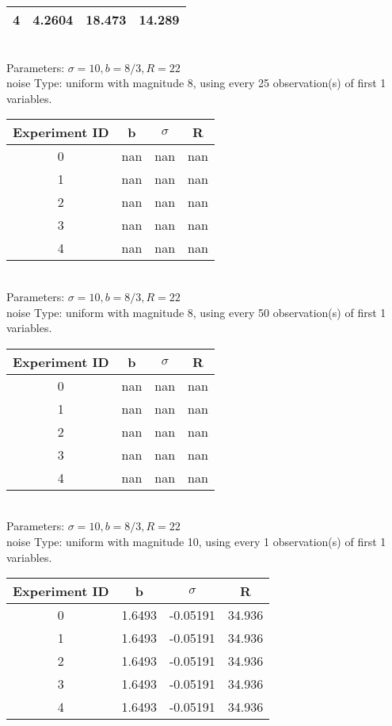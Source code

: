 \begin{multicols}{3}
\begin{tabular}{cccc}
 4 & 4.2604 & 18.473 & 14.289\\ \hline 
 \end{tabular}\\
Parameters: $\sigma=10, b=8/3, R=22$\\
noise Type: uniform with magnitude 8, using every 25 observation(s) of first 1 variables.\\
\begin{tabular}{cccc}
\hline Experiment ID & b & $\sigma$ & R \\ \hline 
0 & nan & nan & nan\\ \hline 
 1 & nan & nan & nan\\ \hline 
 2 & nan & nan & nan\\ \hline 
 3 & nan & nan & nan\\ \hline 
 4 & nan & nan & nan\\ \hline 
 \end{tabular}\\
Parameters: $\sigma=10, b=8/3, R=22$\\
noise Type: uniform with magnitude 8, using every 50 observation(s) of first 1 variables.\\
\begin{tabular}{cccc}
\hline Experiment ID & b & $\sigma$ & R \\ \hline 
0 & nan & nan & nan\\ \hline 
 1 & nan & nan & nan\\ \hline 
 2 & nan & nan & nan\\ \hline 
 3 & nan & nan & nan\\ \hline 
 4 & nan & nan & nan\\ \hline 
 \end{tabular}\\
Parameters: $\sigma=10, b=8/3, R=22$\\
noise Type: uniform with magnitude 10, using every 1 observation(s) of first 1 variables.\\
\begin{tabular}{cccc}
\hline Experiment ID & b & $\sigma$ & R \\ \hline 
0 & 1.6493 & -0.05191 & 34.936\\ \hline 
 1 & 1.6493 & -0.05191 & 34.936\\ \hline 
 2 & 1.6493 & -0.05191 & 34.936\\ \hline 
 3 & 1.6493 & -0.05191 & 34.936\\ \hline 
 4 & 1.6493 & -0.05191 & 34.936\\ \hline 
 \end{tabular}\\

\end{multicols}
